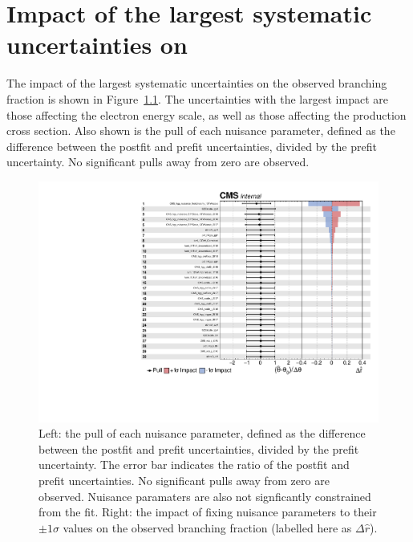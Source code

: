 \chapter{Impact of the largest systematic uncertainties on \BHee}
\label{app:impacts}

The impact of the largest systematic uncertainties on the observed \Hee branching fraction is shown in Figure~\ref{fig:impacts}. The uncertainties with the largest impact are those affecting the electron energy scale, as well as those affecting the \ggH production cross section. Also shown is the pull of each nuisance parameter, defined as the difference between the postfit and prefit uncertainties, divided by the prefit uncertainty. No significant pulls away from zero are observed.

\begin{figure}[htbp!]
\centering
\includegraphics[trim={0cm 0cm 0cm 1cm},clip,width =0.8\linewidth]{Figures/Hee/Results/systs/impacts_pass20_unblinded_dropBkgParams.pdf}\hfill%

\caption[The impact of the top systematic uncertainties on \BHee]{Left: the pull of each nuisance parameter, defined as the difference between the postfit and prefit uncertainties, divided by the prefit uncertainty. The error bar indicates the ratio of the postfit and prefit uncertainties. No significant pulls away from zero are observed. Nuisance paramaters are also not signficantly constrained from the fit. Right: the impact of fixing nuisance parameters to their $\pm1\sigma$ values on the observed \Hee branching fraction (labelled here as $\Delta \hat{r}$).}
\label{fig:impacts}                                              
\end{figure}
